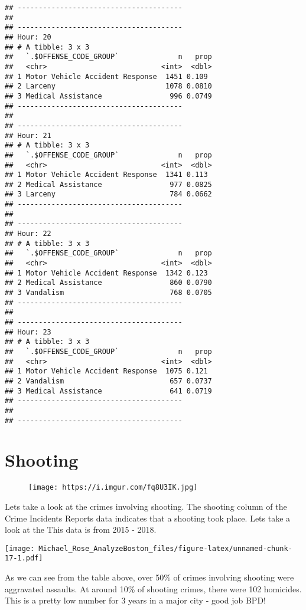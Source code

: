 \documentclass[]{article}
\begin{document}
\begin{verbatim}
## ---------------------------------------
## 
## ---------------------------------------
## Hour: 20
## # A tibble: 3 x 3
##   `.$OFFENSE_CODE_GROUP`              n   prop
##   <chr>                           <int>  <dbl>
## 1 Motor Vehicle Accident Response  1451 0.109 
## 2 Larceny                          1078 0.0810
## 3 Medical Assistance                996 0.0749
## ---------------------------------------
## 
## ---------------------------------------
## Hour: 21
## # A tibble: 3 x 3
##   `.$OFFENSE_CODE_GROUP`              n   prop
##   <chr>                           <int>  <dbl>
## 1 Motor Vehicle Accident Response  1341 0.113 
## 2 Medical Assistance                977 0.0825
## 3 Larceny                           784 0.0662
## ---------------------------------------
## 
## ---------------------------------------
## Hour: 22
## # A tibble: 3 x 3
##   `.$OFFENSE_CODE_GROUP`              n   prop
##   <chr>                           <int>  <dbl>
## 1 Motor Vehicle Accident Response  1342 0.123 
## 2 Medical Assistance                860 0.0790
## 3 Vandalism                         768 0.0705
## ---------------------------------------
## 
## ---------------------------------------
## Hour: 23
## # A tibble: 3 x 3
##   `.$OFFENSE_CODE_GROUP`              n   prop
##   <chr>                           <int>  <dbl>
## 1 Motor Vehicle Accident Response  1075 0.121 
## 2 Vandalism                         657 0.0737
## 3 Medical Assistance                641 0.0719
## ---------------------------------------
## 
## ---------------------------------------
\end{verbatim}

\newpage

\section{Shooting}\label{shooting}

\begin{figure}
\centering
\texttt{[image: https://i.imgur.com/fq8U3IK.jpg]}
\caption{}
\end{figure}

Lets take a look at the crimes involving shooting. The shooting column
of the Crime Incidents Reports data indicates that a shooting took
place. Lets take a look at the This data is from 2015 - 2018.

\texttt{[image: Michael\_Rose\_AnalyzeBoston\_files/figure-latex/unnamed-chunk-17-1.pdf]}

As we can see from the table above, over 50\% of crimes involving
shooting were aggravated assaults. At around 10\% of shooting crimes,
there were 102 homicides. This is a pretty low number for 3 years in a
major city - good job BPD!
\end{document}
